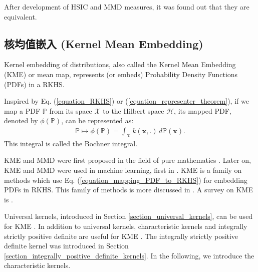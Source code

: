 \documentclass[lang=cn,10pt]{gorgeousnbook}
\numberwithin{equation}{section}%
\numberwithin{figure}{section}%
\begin{document}
\begin{remark}
After development of HSIC and MMD measures, it was found out that they are equivalent.
\end{remark}



\subsection{核均值嵌入 (Kernel Mean Embedding)}\label{section_kernel_embedding_distributions}


\begin{definition}
Kernel embedding of distributions, also called the Kernel Mean Embedding (KME) or mean map, represents (or embeds) Probability Density Functions (PDFs) in a RKHS. 
\end{definition}

\begin{corollary}
Inspired by Eq. (\ref{equation_RKHS}) or (\ref{equation_representer_theorem}), if we map a PDF $\mathbb{P}$ from its space $\mathcal{X}$ to the Hilbert space $\mathcal{H}$, its mapped PDF, denoted by $\phi(\mathbb{P})$, can be represented as:
\begin{align}\label{equation_mapping_PDF_to_RKHS}
\mathbb{P} \mapsto \phi(\mathbb{P}) = \int_\mathcal{X} k(\boldsymbol{x}, .)\, d\mathbb{P}(\boldsymbol{x}).
\end{align}
This integral is called the Bochner integral.
\end{corollary}



KME and MMD were first proposed in the field of pure mathematics \cite{guilbart1978etude}.  
Later on, KME and MMD were used in machine learning, first in \cite{smola2007hilbert}.
KME is a family on methods which use Eq. (\ref{equation_mapping_PDF_to_RKHS}) for embedding PDFs in RKHS. This family of methods is more discussed in \cite{sriperumbudur2010hilbert}. 
A survey on KME is \cite{muandet2016kernel}. 

Universal kernels, introduced in Section \ref{section_universal_kernels}, can be used for KME \cite{sriperumbudur2011universality,simon2018kernel}. In addition to universal kernels, characteristic kernels and integrally strictly positive definite are useful for KME \cite{sriperumbudur2011universality,simon2018kernel}. 
The integrally strictly positive definite kernel was introduced in Section \ref{section_integrally_positive_definite_kernels}. In the following, we introduce the characteristic kernels. 
\end{document}
